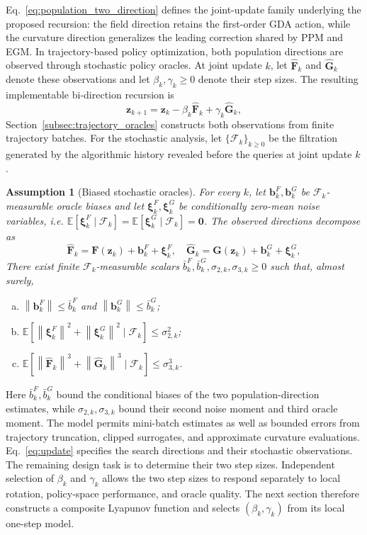 \documentclass[journal]{IEEEtran}
\newtheorem{assumption}{Assumption}
\theoremstyle{remark}
\newcommand{\E}{\mathbb{E}}
\newcommand{\norm}[1]{\left\lVert #1\right\rVert}
\newcommand{\bz}{\boldsymbol{z}}
\newcommand{\bzero}{\boldsymbol{0}}
\newcommand{\bF}{\boldsymbol{F}}
\newcommand{\bG}{\boldsymbol{G}}
\newcommand{\hatF}{\widehat{\boldsymbol{F}}}
\newcommand{\hatG}{\widehat{\boldsymbol{G}}}
\newcommand{\biasF}{\boldsymbol{b}^{F}}
\newcommand{\biasG}{\boldsymbol{b}^{G}}
\newcommand{\noiseF}{\boldsymbol{\xi}^{F}}
\newcommand{\noiseG}{\boldsymbol{\xi}^{G}}
\begin{document}
	Eq.~\eqref{eq:population_two_direction} defines the joint-update family underlying the proposed recursion: the field direction retains the first-order GDA action, while the curvature direction generalizes the leading correction shared by PPM and EGM.
	In trajectory-based policy optimization, both population directions are observed through stochastic policy oracles.
	At joint update $k$, let $\hatF_k$ and $\hatG_k$ denote these observations and let $\beta_k,\gamma_k\ge0$ denote their step sizes.
	The resulting implementable bi-direction recursion is
	\begin{equation}\label{eq:update}
		\bz_{k+1}
		=
		\bz_{k}-\beta_{k}\hatF_{k}+\gamma_{k}\hatG_{k},
	\end{equation}
	Section~\ref{subsec:trajectory_oracles} constructs both observations from finite trajectory batches.
	For the stochastic analysis, let $\{\mathscr F_k\}_{k\ge0}$ be the filtration generated by the algorithmic history revealed before the queries at joint update $k$.
	
	\begin{assumption}[Biased stochastic oracles]\label{ass:oracles}
		For every $k$, let $\biasF_k,\biasG_k$ be $\mathscr F_k$-measurable oracle biases and let $\noiseF_k,\noiseG_k$ be conditionally zero-mean noise variables, i.e. $\E[\noiseF_k\mid\mathscr F_k]=\E[\noiseG_k\mid\mathscr F_k]=\bzero$.
		The observed directions decompose as
		\[
		\hatF_{k}
		=
		\bF(\bz_{k})+\biasF_{k}+\noiseF_{k},
		\quad
		\hatG_{k}
		=
		\bG(\bz_{k})+\biasG_{k}+\noiseG_{k},
		\]
		There exist finite $\mathscr{F}_{k}$-measurable scalars $\bar b^{F}_{k},\bar b^{G}_{k},\sigma_{2,k},\sigma_{3,k}\ge 0$ such that, almost surely,
		\begin{enumerate}[(a)]
			\item $\norm{\biasF_{k}}\le \bar b^{F}_{k}$ and $\norm{\biasG_{k}}\le \bar b^{G}_{k}$;
			\item $\E[\norm{\noiseF_{k}}^{2}+\norm{\noiseG_{k}}^{2} \mid\mathscr{F}_{k}]\le \sigma_{2,k}^{2}$;
			\item $\E[\norm{\hatF_{k}}^{3}+\norm{\hatG_{k}}^{3} \mid\mathscr{F}_{k}]\le \sigma_{3,k}^{3}$.
		\end{enumerate}
	\end{assumption}
	
	Here $\bar b_k^F,\bar b_k^G$ bound the conditional biases of the two population-direction estimates, while $\sigma_{2,k},\sigma_{3,k}$ bound their second noise moment and third oracle moment.
	The model permits mini-batch estimates as well as bounded errors from trajectory truncation, clipped surrogates, and approximate curvature evaluations.
	Eq.~\eqref{eq:update} specifies the search directions and their stochastic observations.
	The remaining design task is to determine their two step sizes.
	Independent selection of $\beta_k$ and $\gamma_k$ allows the two step sizes to respond separately to local rotation, policy-space performance, and oracle quality.
	The next section therefore constructs a composite Lyapunov function and selects $(\beta_k,\gamma_k)$ from its local one-step model.
	
\end{document}
